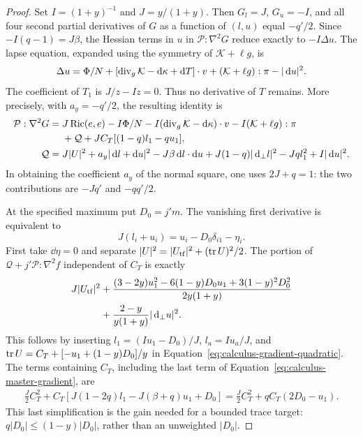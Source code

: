 \begin{proof}
Set $I=(1+y)^{-1}$ and $J=y/(1+y)$.  Then
$G_l=J$, $G_u=-I$, and all four second partial derivatives of $G$
as a function of $(l,u)$ equal $-q'/2$.
Since $-I(q-1)=J\beta$, the Hessian terms in $u$ in
$\mathcal P:\nabla^2G$ reduce exactly to $-I\Delta u$.
The lapse equation, expanded using the symmetry of
$\mathcal K+\ell g$, is
\begin{equation}
 \Delta u=\Phi/N+
     [\operatorname{div}_g\mathcal K-\mathop{}\!\mathrm d\kappa+\mathop{}\!\mathrm d T]\cdot v
     +(\mathcal K+\ell g):\pi-|\mathop{}\!\mathrm d u|^2.
 \label{eq:calculus-log-lapse}
\end{equation}
The coefficient of $T_1$ is $J/z-Iz=0$.  Thus no derivative of $T$
remains.  More precisely, with $a_y=-q'/2$, the resulting identity is
\begin{align}
 \mathcal P:\nabla^2G={}&J\operatorname{Ric}(e,e)-I\Phi/N
   -I(\operatorname{div}_g\mathcal K-\mathop{}\!\mathrm d\kappa)\cdot v
   -I(\mathcal K+\ell g):\pi \notag\\
 &+\mathcal Q+JC_T[(1-q)l_1-qu_1],
 \label{eq:calculus-master-gradient}\\
 \mathcal Q={}&J|U|^2+a_y|\mathop{}\!\mathrm d l+\mathop{}\!\mathrm d u|^2
  -J\beta\mathop{}\!\mathrm d l\cdot\mathop{}\!\mathrm d u
  +J(1-q)|\mathop{}\!\mathrm d_\perp l|^2-Jql_1^2+I|\mathop{}\!\mathrm d u|^2.
 \label{eq:calculus-gradient-quadratic}
\end{align}
In obtaining the coefficient $a_y$ of the normal square, one uses
$2J+q=1$: the two contributions are $-Jq'$ and $-qq'/2$.

At the specified maximum put $D_0=j'm$.  The vanishing first derivative
is equivalent to
\begin{equation}
 J(l_i+u_i)=u_i-D_0\delta_{i1}-\eta_i.
 \label{eq:calculus-maximum-substitution}
\end{equation}
First take $\dd\eta=0$ and separate
$|U|^2=|U_{\rm tf}|^2+(\operatorname{tr} U)^2/2$.
The portion of
$\mathcal Q+j'\mathcal P:\nabla^2f$ independent of $C_T$ is exactly
\begin{align}
 J|U_{\rm tf}|^2
 &+\frac{(3-2y)u_1^2-6(1-y)D_0u_1
                         +3(1-y)^2D_0^2}{2y(1+y)} \notag\\
 &+\frac{2-y}{y(1+y)}|\mathop{}\!\mathrm d_\perp u|^2.
 \label{eq:calculus-maximum-positive-form}
\end{align}
This follows by inserting
$l_1=(Iu_1-D_0)/J$, $l_a=Iu_a/J$, and
$\operatorname{tr} U=C_T+[-u_1+(1-y)D_0]/y$ in
Equation~\eqref{eq:calculus-gradient-quadratic}.
The terms containing $C_T$, including the last term of
Equation~\eqref{eq:calculus-master-gradient}, are
\begin{align}
 \frac J2 C_T^2+
 C_T[J(1-2q)l_1-J(\beta+q)u_1+D_0]
   =\frac J2C_T^2+qC_T(2D_0-u_1).
 \label{eq:calculus-trace-cancellation}
\end{align}
This last simplification is the gain needed for a bounded trace target:
$q|D_0|\le(1-y)|D_0|$, rather than an unweighted $|D_0|$.


\end{proof}
